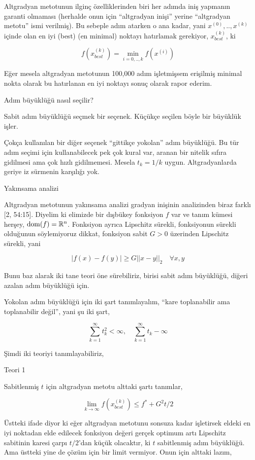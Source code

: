 \documentclass[12pt,fleqn]{article}\usepackage{../../common}
\begin{document}
Altgradyan metotunun ilginç özelliklerinden biri her adımda iniş yapmanın
garanti olmaması (herhalde onun için ``altgradyan inişi'' yerine
``altgradyan metotu'' ismi verilmiş). Bu sebeple adım atarken o ana kadar,
yani $x^{(0)},.., x^{(k)}$ içinde olan en iyi (best) (en minimal) noktayı
hatırlamak gerekiyor, $x_{best}^{(k)}$, ki 

$$
f(x_{best}^{(k)}) = \min_{i=0,..,k} f(x^{(i)})
$$

Eğer mesela altgradyan metotunun 100,000 adım işletmişsem erişilmiş minimal
nokta olarak bu hatırlanan en iyi noktayı sonuç olarak rapor ederim.

Adım büyüklüğü nasıl seçilir?

Sabit adım büyüklüğü seçmek bir seçenek. Küçükçe seçilen böyle bir
büyüklük işler. 

Çokça kullanılan bir diğer seçenek ``gittikçe yokolan'' adım büyüklüğü. Bu
tür adım seçimi için kullanabilecek pek çok kural var, aranan bir nitelik
sıfıra gidilmesi ama çok hızlı gidilmemesi. Mesela $t_k = 1/k$ uygun.
Altgradyanlarda geriye iz sürmenin karşılığı yok.

Yakınsama analizi

Altgradyan metotunun yakınsama analizi gradyan inişinin analizinden biraz
farklı [2, 54:15]. Diyelim ki elimizde bir dışbükey fonksiyon $f$ var ve
tanım kümesi herşey, $\operatorname{dom}(f) = \mathbb{R}^n$. Fonksiyon ayrıca Lipschitz
sürekli, fonksiyonun sürekli olduğunun söylemiyoruz dikkat, fonksiyon sabit
$G > 0$ üzerinden Lipschitz sürekli, yani

$$
|f(x) - f(y)| \ge G || x-y ||_2 \quad \forall x,y
$$

Bunu baz alarak iki tane teori öne sürebiliriz, birisi sabit adım
büyüklüğü, diğeri azalan adım büyüklüğü için.

Yokolan adım büyüklüğü için iki şart tanımlayalım, ``kare toplanabilir ama
toplanabilir değil'', yani şu iki şart,

$$
\sum  _{k=1}^{\infty} t_k^2 < \infty, \quad \sum  _{k=1}^{\infty} t_k - \infty
$$

Şimdi iki teoriyi tanımlayabiliriz,

Teori 1

Sabitlenmiş $t$ için altgradyan metotu alttaki şartı tanımlar, 

$$
\lim_{k \to \infty} f(x_{best}^{(k)} ) \le f^* + G^2 t / 2
$$

Üstteki ifade diyor ki eğer altgradyan metotunu sonsuza kadar işletirsek
eldeki en iyi noktadan elde edilecek fonksiyon değeri gerçek optimum artı
Lipschitz sabitinin karesi çarpı $t/2$'dan küçük olacaktır, ki $t$
sabitlenmiş adım büyüklüğü. Ama üstteki yine de çözüm için bir limit
vermiyor. Onun için alttaki lazım,
\end{document}
